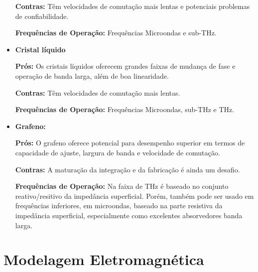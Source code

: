\documentclass[
	12pt,				%
	openright,			%
	oneside,			%
	a4paper,			%
	english,			%
	brazil				%
	]{abntex2}
\begin{document}
\begin{itemize}
    \textbf{Contras:} Têm velocidades de comutação mais lentas e potenciais problemas de confiabilidade.

    \textbf{Frequências de Operação:} Frequências Microondas e sub-THz.

\item \textbf{Cristal líquido}

    \textbf{}\textbf{Prós:} Os cristais líquidos oferecem grandes faixas de mudança de fase e operação de banda larga, além de boa linearidade. 

    \textbf{Contras:} Têm velocidades de comutação mais lentas.

    \textbf{Frequências de Operação:} Frequências Microondas, sub-THz e THz.

\item \textbf{Grafeno: }

    \textbf{Prós:} O grafeno oferece potencial para desempenho superior em termos de capacidade de ajuste, largura de banda e velocidade de comutação.

    \textbf{Contras:}  A maturação da integração e da fabricação é ainda um  desafio.

    \textbf{Frequências de Operação:} Na faixa de THz é baseado no conjunto reativo/resitivo da impedância superficial. Porém, também pode ser usado em frequências inferiores, em microondas, baseado na parte resistiva da impedância superficial, especialmente como excelentes absorvedores banda larga.

\end{itemize}


\section{Modelagem Eletromagnética}\label{ModelagemElectro}
\end{document}
